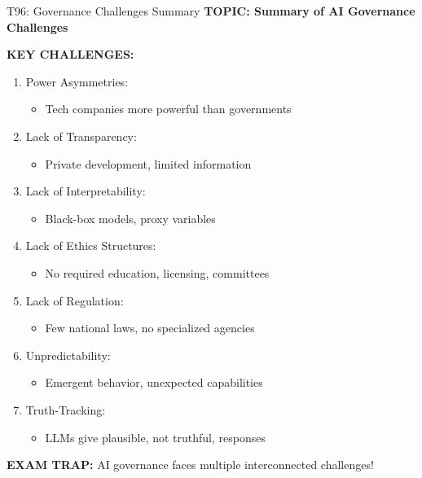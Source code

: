 \documentclass[8pt]{beamer}
\begin{document}
	\begin{frame}{T96: Governance Challenges Summary}
		\fontsize{6.5}{7.5}\selectfont
		\textbf{TOPIC: Summary of AI Governance Challenges}
		
		\vspace{0.1cm}
		\textbf{KEY CHALLENGES:}
		\begin{enumerate}
			\item \textcolor{myblue}{Power Asymmetries:}
			\begin{itemize}
				\item Tech companies more powerful than governments
			\end{itemize}
			\item \textcolor{myblue}{Lack of Transparency:}
			\begin{itemize}
				\item Private development, limited information
			\end{itemize}
			\item \textcolor{myblue}{Lack of Interpretability:}
			\begin{itemize}
				\item Black-box models, proxy variables
			\end{itemize}
			\item \textcolor{myblue}{Lack of Ethics Structures:}
			\begin{itemize}
				\item No required education, licensing, committees
			\end{itemize}
			\item \textcolor{myblue}{Lack of Regulation:}
			\begin{itemize}
				\item Few national laws, no specialized agencies
			\end{itemize}
			\item \textcolor{myblue}{Unpredictability:}
			\begin{itemize}
				\item Emergent behavior, unexpected capabilities
			\end{itemize}
			\item \textcolor{myblue}{Truth-Tracking:}
			\begin{itemize}
				\item LLMs give plausible, not truthful, responses
			\end{itemize}
		\end{enumerate}
		
		\textcolor{myred}{\textbf{EXAM TRAP:}} AI governance faces \textcolor{myblue}{multiple interconnected challenges}!
	\end{frame}
	
\end{document}
